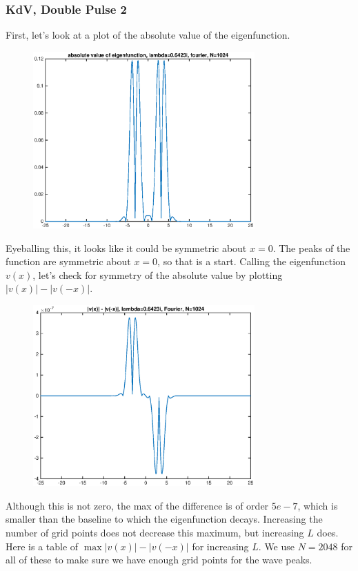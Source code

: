 \documentclass[12pt]{article}
\begin{document}
\subsubsection*{KdV, Double Pulse 2}
First, let's look at a plot of the absolute value of the eigenfunction.
\begin{figure}[H]
\includegraphics[width=8.5cm]{2doubleabseigenfn}
\end{figure}
Eyeballing this, it looks like it could be symmetric about $x = 0$. The peaks of the function are symmetric about $x = 0$, so that is a start. Calling the eigenfunction $v(x)$, let's check for symmetry of the absolute value by plotting $|v(x)| - |v(-x)|$.
\begin{figure}[H]
\includegraphics[width=8.5cm]{2doubleabseigenfnflipdiff}
\end{figure}
Although this is not zero, the max of the difference is of order $5e-7$, which is smaller than the baseline to which the eigenfunction decays. Increasing the number of grid points does not decrease this maximum, but increasing $L$ does. Here is a table of $\max{|v(x)| - |v(-x)|}$ for increasing $L$. We use $N = 2048$ for all of these to make sure we have enough grid points for the wave peaks.
\end{document}
